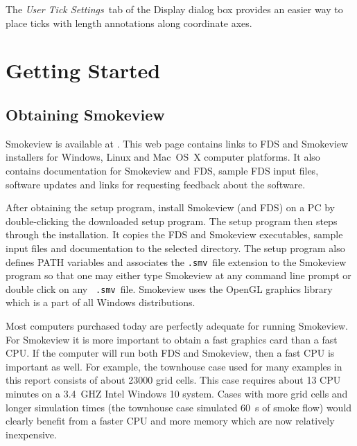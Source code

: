 \documentclass[11pt,twoside]{book}
\begin{document}
The {\em User Tick Settings}\ tab of the Display dialog box
provides an easier way to place ticks with length annotations
along coordinate axes.



\section{Getting Started}

\subsection{Obtaining Smokeview}

Smokeview is available at .
This web page contains links to FDS and Smokeview installers for
Windows, Linux and Mac~OS~X computer platforms. It also contains documentation for
Smokeview and FDS, sample FDS input files, software updates and
links for requesting feedback about the software.

After obtaining the setup program, install Smokeview (and FDS)  on a PC by
double-clicking the downloaded
setup program. The setup program then steps through the
installation. It copies the FDS and Smokeview executables,
sample input files and documentation to the selected directory.  The setup program also
defines PATH variables and associates the {\tt .smv}\ file
extension to the Smokeview program so that one may either type
Smokeview at any command line prompt or double click on any {\tt
.smv}\ file. Smokeview uses the OpenGL graphics library which is a
part of all Windows distributions.

Most computers purchased today are perfectly adequate for running
Smokeview. For Smokeview it is more important to obtain a fast
graphics card than a fast CPU. If the computer will run both FDS
and Smokeview, then a fast CPU is important as well.
For example, the townhouse case used for many examples in this
report consists of about 23000 grid cells.  This case requires
about 13 CPU minutes on a 3.4~GHZ Intel Windows 10
system. Cases with more grid cells and longer simulation times
(the townhouse case simulated 60~s of smoke flow) would clearly
benefit from a faster CPU and more memory which are now relatively
inexpensive.
\end{document}
